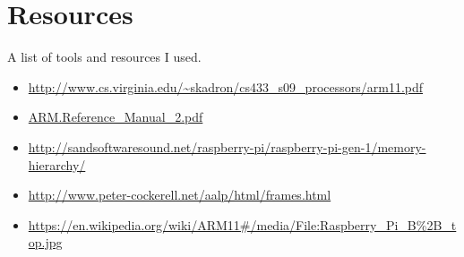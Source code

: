 \documentclass[twoside]{article}
\begin{document}
	\section{Resources}
	
	\noindent
	A list of tools and resources I used.
	
	\begin{itemize}
		
		\item \url{http://www.cs.virginia.edu/~skadron/cs433_s09_processors/arm11.pdf}
		
		\item \url{ARM.Reference_Manual_2.pdf}  
		
		\item \url{http://sandsoftwaresound.net/raspberry-pi/raspberry-pi-gen-1/memory-hierarchy/}
		
		\item \url{http://www.peter-cockerell.net/aalp/html/frames.html}
		
		\item \url{https://en.wikipedia.org/wiki/ARM11#/media/File:Raspberry_Pi_B%2B_top.jpg}
		
	\end{itemize}
	
\end{document}
